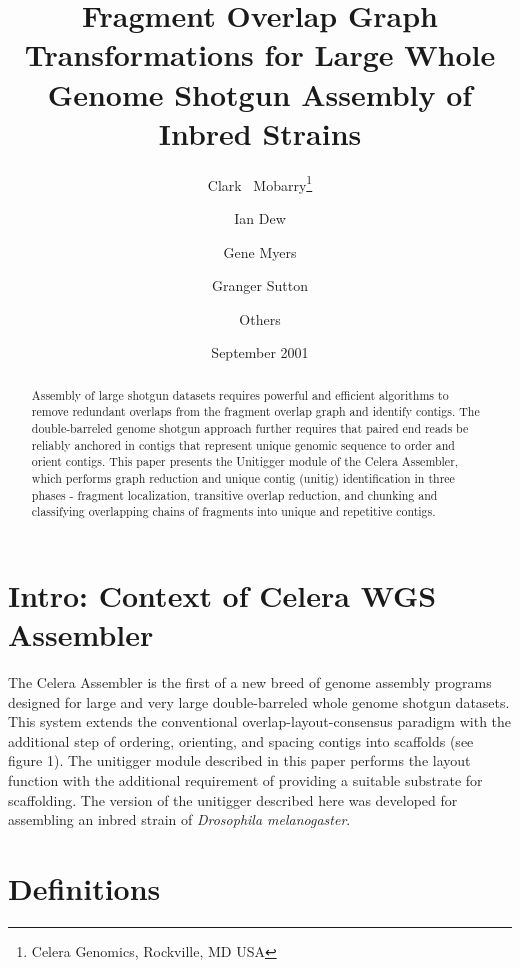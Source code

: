 \documentclass{article}
\begin{document}
\setmarginsrb{1in}{1in}{1in}{1in}{0pt}{0mm}{0pt}{0mm}

\title{Fragment Overlap Graph Transformations for Large Whole Genome Shotgun Assembly of Inbred Strains}
\author{
Clark ~Mobarry\thanks{Celera Genomics, Rockville, MD USA}
\and
Ian Dew
\and
Gene Myers
\and
Granger Sutton
\and
Others
}
\date{September 2001}
\maketitle



\begin{abstract}

Assembly of large shotgun datasets requires powerful and efficient
algorithms to remove redundant overlaps from the fragment overlap
graph and identify contigs. The double-barreled genome shotgun
approach further requires that paired end reads be reliably anchored
in contigs that represent unique genomic sequence to order and orient
contigs. This paper presents the Unitigger module of the Celera
Assembler, which performs graph reduction and unique contig (unitig)
identification in three phases - fragment localization, transitive
overlap reduction, and chunking and classifying overlapping chains of
fragments into unique and repetitive contigs.

\end{abstract}

\section{Intro: Context of Celera WGS Assembler}
The Celera Assembler is the first of a new breed of genome assembly
programs designed for large and very large double-barreled whole
genome shotgun datasets. This system extends the conventional
overlap-layout-consensus paradigm with the additional step of
ordering, orienting, and spacing contigs into scaffolds (see figure
1). The unitigger module described in this paper performs the layout
function with the additional requirement of providing a suitable
substrate for scaffolding. The version of the unitigger described here
was developed for assembling an inbred strain of \emph{Drosophila
melanogaster}.


\section{Definitions}
\end{document}
